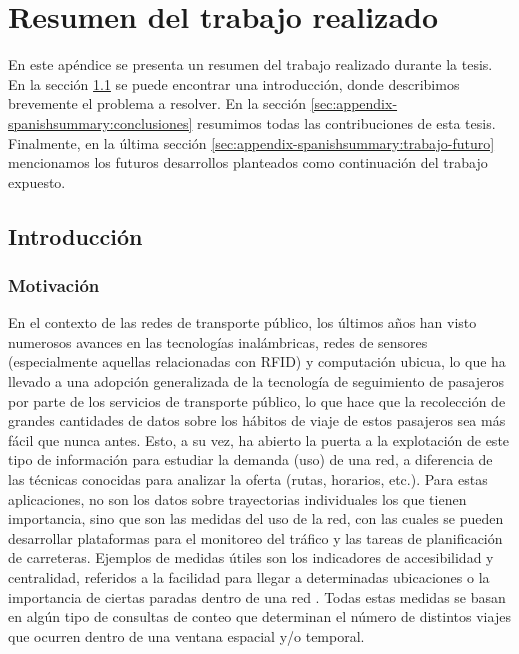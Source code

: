 \chapter{Resumen del trabajo realizado}
\label{ch:appendix-spanishsummary}

    En este ap\'endice se presenta un resumen del trabajo realizado durante la tesis. En la secci\'on \ref{sec:appendix-spanishsummary:introduccion} se puede encontrar una introducci\'on, donde describimos brevemente el problema a resolver. En la secci\'on \ref{sec:appendix-spanishsummary:conclusiones} resumimos todas las contribuciones de esta tesis. Finalmente, en la \'ultima secci\'on \ref{sec:appendix-spanishsummary:trabajo-futuro} mencionamos los futuros desarrollos planteados como continuaci\'on del trabajo expuesto.

\section{Introducci\'on}
\label{sec:appendix-spanishsummary:introduccion}

\subsection{Motivaci\'on}

    En el contexto de las redes de transporte p\'ublico, los \'ultimos a\~nos han visto numerosos avances en las tecnolog\'ias inal\'ambricas, redes de sensores (especialmente aquellas relacionadas con RFID) y computaci\'on ubicua, lo que ha llevado a una adopci\'on generalizada de la tecnolog\'ia de seguimiento de pasajeros por parte de los servicios de transporte p\'ublico, lo que hace que la recolecci\'on de grandes cantidades de datos sobre los h\'abitos de viaje de estos pasajeros sea m\'as f\'acil que nunca antes.
    Esto, a su vez, ha abierto la puerta a la explotaci\'on de este tipo de informaci\'on para estudiar la demanda (uso) de una red, a diferencia de las t\'ecnicas conocidas para analizar la oferta (rutas, horarios, etc.).
    Para estas aplicaciones, no son los datos sobre trayectorias individuales los que tienen importancia, sino que son las medidas del uso de la red, con las cuales se pueden desarrollar plataformas para el monitoreo del tr\'afico y las tareas de planificaci\'on de carreteras. Ejemplos de medidas \'utiles son los indicadores de accesibilidad y centralidad, referidos a la facilidad para llegar a determinadas ubicaciones o la importancia de ciertas paradas dentro de una red \cite{Morency2007193, El-Geneidy2011, Wang2015335}. Todas estas medidas se basan en alg\'un tipo de consultas de conteo que determinan el n\'umero de distintos viajes que ocurren dentro de una ventana espacial y/o temporal.
    
